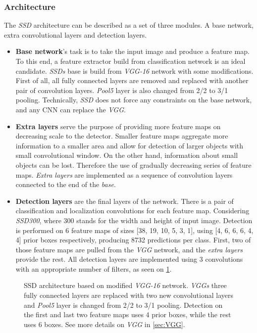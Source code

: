 \subsubsection{Architecture}
The \textit{SSD} architecture can be described as a set of three modules. A base network, extra convolutional layers and detection layers.

\begin{itemize}
    \item \textbf{Base network}'s task is to take the input image and produce a feature map. To this end, a feature extractor build from classification network is an ideal candidate. \textit{SSDs} base is build from \textit{VGG-16} network with some modifications. First of all, all fully connected layers are removed and replaced with another pair of convolution layers. \textit{Pool5} layer is also changed from 2/2 to 3/1 pooling. Technically, \textit{SSD} does not force any constraints on the base network, and any CNN can replace the \textit{VGG}.
    \item \textbf{Extra layers} serve the purpose of providing more feature maps on decreasing scale to the detector. Smaller feature maps aggregate more information to a smaller area and allow for detection of larger objects with small convolutional window. On the other hand, information about small objects can be lost. Therefore the use of gradually decreasing series of feature maps. \textit{Extra layers} are implemented as a sequence of convolution layers connected to the end of the \textit{base}.
    \item \textbf{Detection layers} are the final layers of the network. There is a pair of classification and localization convolutions for each feature map. Considering \textit{SSD300}, where 300 stands for the width and height of input image. Detection is performed on 6 feature maps of sizes [38, 19, 10, 5, 3, 1], using [4, 6, 6, 6, 4, 4] prior boxes respectively, producing 8732 predictions per class. First, two of those feature maps are pulled from the \textit{VGG} network, and the \textit{extra layers} provide the rest. All detection layers are implemented using 3 convolutions with an appropriate number of filters, as seen on \cref{fig:VGGSSD}.
\end{itemize}

\begin{figure}
    \VGGSSD
    \caption{SSD architecture based on modified \textit{VGG-16} network. \textit{VGGs} three fully connected layers are replaced with two new convolutional layers and \textit{Pool5} layer is changed from 2/2 to 3/1 pooling. Detection on the first and last two feature maps uses 4 prior boxes, while the rest uses 6 boxes. See more details on \textit{VGG} in \cref{sec:VGG}.}
    \label{fig:VGGSSD}
\end{figure}


